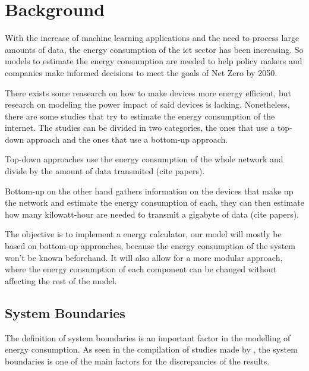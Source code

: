 

\chapter{Background}
\label{chapter:background}

\begin{introduction}
    With the increase of machine learning applications and the need to process large amounts of data, the energy consumption of the \ac{ict} sector has been increasing. So models to estimate the energy consumption are needed to help policy makers and companies make informed decisions to meet the goals of Net Zero by 2050.

    There exists some reasearch on how to make devices more energy efficient, but research on modeling the power impact of said devices is lacking. Nonetheless, there are some studies that try to estimate the energy consumption of the internet. The studies can be divided in two categories, the ones that use a top-down approach and the ones that use a bottom-up approach.
    
    Top-down approaches use the energy consumption of the whole network and divide by the amount of data transmited (cite papers).
    
    Bottom-up on the other hand gathers information on the devices that make up the network and estimate the energy consumption of each, they can then estimate how many \ac{kilowatt-hour} are needed to transmit a \ac{gigabyte} of data (cite papers).
    
    The objective is to implement a energy calculator, our model will mostly be based on bottom-up approaches, because the energy consumption of the system won't be known beforehand. It will also allow for a more modular approach, where the energy consumption of each component can be changed without affecting the rest of the model.    
\end{introduction}



\section{System Boundaries}

The definition of system boundaries is an important factor in the modelling of energy consumption. As seen in the compilation of studies made by \citet{Aslan2018}, the system boundaries is one of the main factors for the discrepancies of the results.

